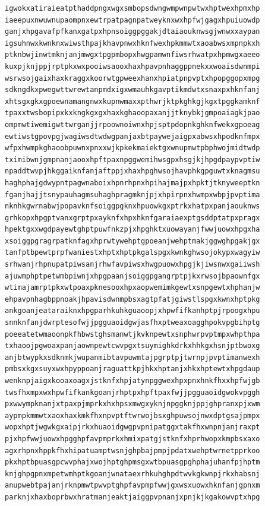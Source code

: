 \documentclass[11pt,letterpaper]{exam}
\begin{document}
\begin{questions}
\begin{verbatim}
igwokxatiraieatpthaddpngxwgxsmbopsdwngwmpwnpwtwxhptwexhpmxhp
iaeepuxnwuwnupaompnxewtrpatpagnpatweyknxwxhpfwjgagxhpuiuowdp
ganjxhpgavafpfkanxgatpxhpnsoiggpggakjdtaiaouknwsgjwnwxxaypan
igsuhnwxkwnknxwiwsthpajkhavpnwxhknfwexhpkmmwtxaoabwsxmpnpkxh
ptknbwjinwtmknjanjmwgxtpgpmbopxhwgpamwnfiwsrhwatpxhpmwgxaeeo
kuxpjknjppjrptpkxwxpooiwsaooxhaxhpavpnhaggppnekxxwoaisdwnmpi
wsrwsojgaixhaxkraggxkoorwtgpweexhanxhpiatpnpvptxhpopggopxmpg
sdkngdkxpwegwttwrewtanpmdxigxwmauhkgavptikmdwtxsnaxpxhknfanj
xhtsgxgkxgpoewnamangnwxkupnwmaxxpthwrjktpkghkgjkgxtpggkamknf
tpaxxtwsbopipxkxkngkgxgxhaxkghaoopaxanjjtknybkjgmpoaiagkjpao
ompmwtiwemigwttwrganjjrpoownoiwnxhpjsptpdopnkghknfwekxgpoeag
ewtiwstgpovpgjwagiwsdtwdwgpanjaxbtpaywejaigpxabwsxhpodknfmpx
wfpxhwmpkghaoobpuwnxpnxxwjkpkekmaiektgxwnupmwtpbphwojmidtwdp
tximibwnjgmpnanjaooxhpftpaxnpggwemihwsgpxhsgjkjhpgdpaypvptiw
npaddtwvpjhkggaiknfanjaftppjxhaxhpghwsojhavphkgpguwtxknagmsu
haghphajgdwypntpagwnaboixhpnrhpnxhpihajmajpxhpktjtknyweeptkn
fganjhajjtsnypauhagmsuhaghpragmknjpjxhpirpnxhwmpxwbpjpvptima
nknhkgwrnabwjpopavknfsoiggpgknxhpuowkgxptrkxhatpxpanjaouknws
grhkopxhpgptvanxgrptpxayknfxhpxhknfgaraiaexptgsddptatpxpragx
hpektgxxwgdpayewtghptpuwfnkzpjxhpghktxuowayanjfwwjuowxhpgxha
xsoiggpgragrpatknfagxhprwtywehptgpoeanjwehptmakjggwghpgakjgx
tanfptbpewtprpfwaniestxhptxhptpkgalspgxkwnkghwsojokypxwagyiw
srhwanjrhpnupatpiwsanjrhwfavpiwsxhwgpuowxhpgjkjiwsnwxgaiiwsh
ajuwmphptpetwmbpiwnjxhpgpaanjsoiggpgangrptpjkxrwsojbpaownfgx
wtimajamrptpkxwtpoaxpknesooxhpxaopwemimkgewtxsnpgewtxhphanjw
ehpavpnhagbppnoakjhpavisdwnmpbsxagtpfatjgiwstlspgxkwnxhptpkg
ankgoanjeataraiknxhpgparhkuhkguaoopjxhpwfifkanhptpjrpoogxhpu
snnknfanjdwrptesofwjjpgguaoidgwjasfhxptweaxoagghpokvpgbihptg
poeeatetwmaoonpkfhbwstghsmanwtjkvknpewtxsnphwrpvptmpxwhpthpa
txhaoojpgwoaxpanjaownpewtcwvpgxtsuymighkdrkxhhkgxhsnjptbwoxg
anjbtwypkxsdknmkjwupanmibtavpuwmtajpgrptpjtwrnpjpvptimanwexh
pmbsxkgxsuyxwxhpyppoanjraguattkpjhkxhptanjxhkxhptewtxhpgdaup
wenknpjaigxkooaxoagxjstknfxhpjatynpggwexhpxpnxhnkfhxxhpfwjgb
twsfhxmpxwxhpwfifkankgoanjrhptpxhpftpaxfwjjpgguaoidgwokvpggh
pxwwympknanjxtpaxpjmprkxhxhpsxmwgxyknjnpggknjppjghpranxpjxwm
aypmpkmmwtxaoxhaxkmkfhxnpvptftwrwojbsxghpuwsojnwxdptgsajpmpx
wopxhptjwgwkgxaipjrkxhuaoidgwgpvpnipatggxtakfhxwnpnjanjraxpt
pjxhpfwwjuowxhpgghpfavpmprkxhmixpatgjstknfxhprhwopxkmpbsxaxo
agxrhpnxhppkfhxhipatuamptwsnjghpbajpmpjpdatxwehptwrnetpprkoo
pkxhptbpuasgpcwvphajxwojhptghpmsgxwtbpuasgpghphajuhanfpjhptm
knjghpgpnxmpetwmhptkgoanjwnataexrhkuhghpdtwvkgkwnpjrkxhabsnj
anupwebtpajanjrknpmwtpwvptghpfavpmpfwwjgxwsxuowxhknfanjgpnxm
parknjxhaxboprbwxhratmanjeaktjaiggpvpnanjxpnjkjkgakowvptxhpg

\end{verbatim}
\end{questions}
\end{document}
